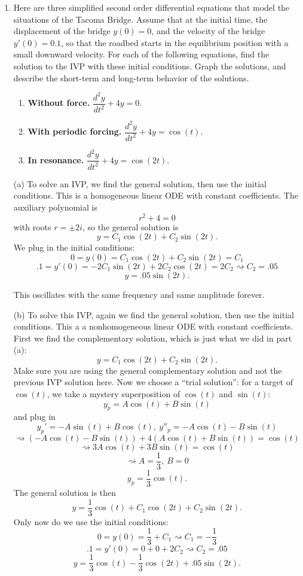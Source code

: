\documentclass[12pt]{amsart}
\numberwithin{equation}{section}
\theoremstyle{plain} %
\newcommand{\rsa}{\rightsquigarrow}
\theoremstyle{definition}
\theoremstyle{remark}
\begin{document}
\begin{enumerate}
\item
Here are three simplified second order differential equations that model the situations of the Tacoma Bridge. Assume that at the initial time, the displacement of the bridge $y(0)=0$, and the velocity of the bridge $y'(0)=0.1$,  so that the roadbed
starts in the equilibrium position with a small downward velocity. For each of the following equations, find the solution to the IVP with these initial conditions. Graph the solutions, and describe the short-term and long-term behavior of the solutions.
\begin{enumerate}
\item {\bf Without force.} $\dfrac{d^2y}{dt^2} + 4y = 0$.
\item {\bf With periodic forcing.} $\dfrac{d^2y}{dt^2} + 4y = \cos(t)$.
\item {\bf In resonance.} $\dfrac{d^2y}{dt^2} + 4y = \cos(2t)$.
\end{enumerate}
\begin{framed}
(a) To solve an IVP, we find the general solution, then use the initial conditions.
This is a homogeneous linear ODE with constant coefficients. The auxiliary polynomial is
\[ r^2 + 4 = 0\]
with roots $r=\pm 2i$, so the general solution is
\[ y = C_1 \cos(2t) + C_2 \sin(2t).\]
We plug in the initial conditions:
\[ 0 = y(0) = C_1 \cos(2t) + C_2 \sin(2t) = C_1\]
\[ .1 = y'(0) = -2 C_1 \sin(2t) + 2 C_2 \cos(2t) = 2 C_2 \rsa C_2 = .05\]
\[ y = .05 \sin(2t).\]

This oscillates with the same frequency and same amplitude forever.

(b) To solve this IVP, again we find the general solution, then use the initial conditions. This a a nonhomogeneous linear ODE with constant coefficients. First we find the complementary solution, which is just what we did in part (a):
\[ y = C_1 \cos(2t) + C_2 \sin(2t).\]
Make sure you are using the general complementary solution and not the previous IVP solution here. Now we choose a ``trial solution'': for a target of $\cos(t)$, we take a mystery superposition of $\cos(t)$ and $\sin(t)$:
\[ y_p = A \cos(t) +  B \sin(t)\]
and plug in
\[ y_p' = -A \sin(t) + B\cos(t), \ y''_p = -A \cos(t) - B \sin(t)\]
\[ \rsa (-A \cos(t) - B \sin(t)) + 4 ( A \cos(t) +  B \sin(t)) = \cos(t)\]
\[ \rsa 3A \cos(t) + 3B\sin(t) = \cos(t)\]
\[\rsa A= \frac{1}{3}, \ B= 0\]
\[ y_p  = \frac{1}{3} \cos(t).\]
The general solution is then
\[ y = \frac{1}{3} \cos(t) + C_1 \cos(2t) + C_2 \sin(2t).\]
Only now do we use the initial conditions:
\[ 0 = y(0) = \frac{1}{3} + C_1 \rsa C_1 = - \frac{1}{3}\]
\[ .1 = y'(0) = 0 + 0 + 2 C_2 \rsa C_2 = .05\]
\[ y = \frac{1}{3} \cos(t)  - \frac{1}{3} \cos(2t) + .05 \sin(2t).\]


\end{framed}
\end{enumerate}
\end{document}
